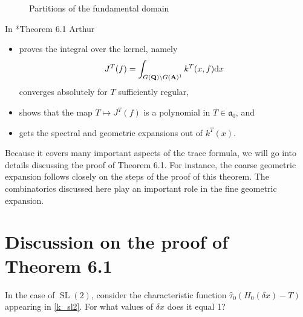 \documentclass[11pt]{amsart}
\def\A{\mathbf A}
\def\Q{\mathbf Q}
\def\aaa{\mathfrak a}
\def\cb#1{{\color{blue}#1}}
\def\d{\text d}
\def\bs{\setminus} 			%
\def\sl{\operatorname{SL}}
\theoremstyle{remark}
\begin{document}
\begin{figure}
\centering
\caption{Partitions of the fundamental domain} \label{fig:fd}
\end{figure}

In \cite{clay}*{Theorem 6.1} Arthur 
\begin{itemize}
	\item proves the integral over the kernel, namely
			\[ J^T(f) = \int_{G(\Q) \bs G(\A)^1} k^T(x, f) \d x \]
			converges absolutely for $T$ sufficiently regular,
	\item shows that the map $T \mapsto J^T(f)$ is a polynomial in $T \in \aaa_0$, and
	\item gets the spectral and geometric expansions out of $k^T(x)$. 
\end{itemize}
Because it covers many important aspects of the trace formula, we will go into details discussing the proof of Theorem 6.1. For instance, the coarse geometric expansion follows closely on the steps of the proof of this theorem. The combinatorics discussed here play an important role in the fine geometric expansion. 

\section{Discussion on the proof of Theorem 6.1} \label{6.1proof}

\cb{In the case of $\sl(2)$, consider the characteristic function $\hat\tau_0(H_0(\delta x) - T)$ appearing in \cref{k_sl2}. For what values of $\delta x$ does it equal 1? }
\end{document}

